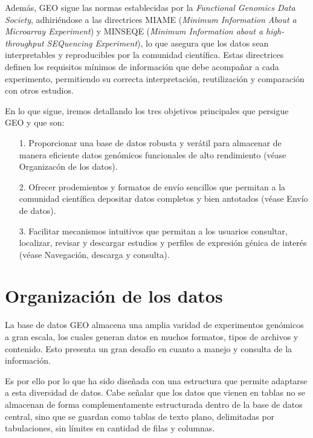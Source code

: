 Además, GEO sigue las normas establecidas por la \textit{Functional Genomics Data Society}, adhiriéndose a las directrices MIAME (\textit{Minimum Information About a Microarray Experiment}) 
y MINSEQE (\textit{Minimum Information about a high-throughput SEQuencing Experiment}), lo que asegura que los datos sean interpretables y reproducibles 
por la comunidad científica. Estas directrices definen los requisitos mínimos de información que debe acompañar a cada experimento, permitiendo 
su correcta interpretación, reutilización y comparación con otros estudios. \newline

En lo que sigue, iremos detallando los tres objetivos principales que persigue GEO y que son:

\begin{itemize}
    \item[1.] Proporcionar una base de datos robusta y verátil para almacenar de manera eficiente datos genómicos funcionales de alto rendimiento
    (véase Organizacón de los datos).
    \item[2.] Ofrecer prodemientos y formatos de envío sencillos que permitan a la comunidad científica depositar datos completos y bien antotados
    (véase Envío de datos).
    \item[3.] Facilitar mecanismos intuitivos que permitan a los usuarios consultar, localizar, revisar y descargar estudios y perfiles de expresión génica
    de interés (véase Navegación, descarga y consulta).
\end{itemize}


\section{Organización de los datos}


La base de datos GEO almacena una amplia varidad de experimentos genómicos a gran escala, los cuales generan datos en muchos formatos, tipos de archivos
y contenido. Esto presenta un gran desafío en cuanto a manejo y consulta de la información. \newline

Es por ello por lo que ha sido diseñada con una estructura que permite adaptarse a esta diversidad de datos. Cabe señalar que los datos que vienen en tablas
no se almacenan de forma complementamente estructurada dentro de la base de datos central, sino que se guardan como tablas de texto plano, delimitadas por
tabulaciones, sin límites en cantidad de filas y columnas. \newline

